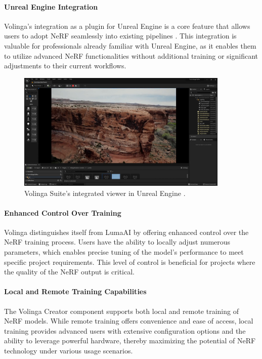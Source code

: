 \paragraph{Unreal Engine Integration}
Volinga's integration as a plugin for Unreal Engine \cite{noauthor_unreal_nodate} is a core feature that allows users to adopt NeRF seamlessly into existing pipelines .
This integration is valuable for professionals already familiar with Unreal Engine, as it enables them to utilize advanced NeRF functionalities without additional training or significant adjustments to their current workflows.

\begin{figure}[h!]
  \centering
  \includegraphics[width=0.9\textwidth]{figures/related-volinga.png}
  \caption{Volinga Suite's integrated viewer in Unreal Engine \cite{noauthor_volinga_nodate}.}
  \label{fig:volinga-viewer}
\end{figure}

\paragraph{Enhanced Control Over Training}
Volinga distinguishes itself from LumaAI by offering enhanced control over the NeRF training process.
Users have the ability to locally adjust numerous parameters, which enables precise tuning of the model's performance to meet specific project requirements.
This level of control is beneficial for projects where the quality of the NeRF output is critical.

\paragraph{Local and Remote Training Capabilities}
The Volinga Creator component supports both local and remote training of NeRF models.
While remote training offers convenience and ease of access, local training provides advanced users with extensive configuration options and the ability to leverage powerful hardware, thereby maximizing the potential of NeRF technology under various usage scenarios.

